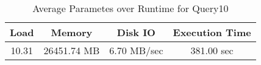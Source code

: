 \documentclass[../../main.tex]{subfiles}
\begin{document}
\begin{minipage}{.5\textwidth}
    \end{minipage}
    \begin{table}
        \begin{center}
            \begin{tabular}{ |c|c|c|c| } 
            \hline
            Load & Memory & Disk IO & Execution Time\\
            \hline
            10.31 & 26451.74 MB & 6.70 MB/sec & 381.00 sec \\
            \hline
            \end{tabular}
            \\[1pt]
            \caption{Average Parametes over Runtime for Query10}
        \end{center}
    \end{table}
    \pagebreak
\end{document}
